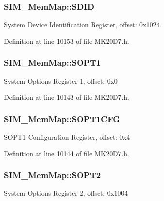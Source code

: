 \subsubsection[{\texorpdfstring{S\+D\+ID}{SDID}}]{ S\+I\+M\+\_\+\+Mem\+Map\+::\+S\+D\+ID}\hypertarget{struct_s_i_m___mem_map_a536b8d3e185149c51e88387350e20fb3}{}\label{struct_s_i_m___mem_map_a536b8d3e185149c51e88387350e20fb3}
System Device Identification Register, offset\+: 0x1024 

Definition at line 10153 of file M\+K20\+D7.\+h.

\subsubsection[{\texorpdfstring{S\+O\+P\+T1}{SOPT1}}]{ S\+I\+M\+\_\+\+Mem\+Map\+::\+S\+O\+P\+T1}\hypertarget{struct_s_i_m___mem_map_a1152a6ef88c78e762df97badf10b5050}{}\label{struct_s_i_m___mem_map_a1152a6ef88c78e762df97badf10b5050}
System Options Register 1, offset\+: 0x0 

Definition at line 10143 of file M\+K20\+D7.\+h.

\subsubsection[{\texorpdfstring{S\+O\+P\+T1\+C\+FG}{SOPT1CFG}}]{ S\+I\+M\+\_\+\+Mem\+Map\+::\+S\+O\+P\+T1\+C\+FG}\hypertarget{struct_s_i_m___mem_map_a9b6ea6819e80eeaa90754b6e91fcc808}{}\label{struct_s_i_m___mem_map_a9b6ea6819e80eeaa90754b6e91fcc808}
S\+O\+P\+T1 Configuration Register, offset\+: 0x4 

Definition at line 10144 of file M\+K20\+D7.\+h.

\subsubsection[{\texorpdfstring{S\+O\+P\+T2}{SOPT2}}]{ S\+I\+M\+\_\+\+Mem\+Map\+::\+S\+O\+P\+T2}\hypertarget{struct_s_i_m___mem_map_ae4c4bf827aeca9c2de082cdfafdea3d1}{}\label{struct_s_i_m___mem_map_ae4c4bf827aeca9c2de082cdfafdea3d1}
System Options Register 2, offset\+: 0x1004 


